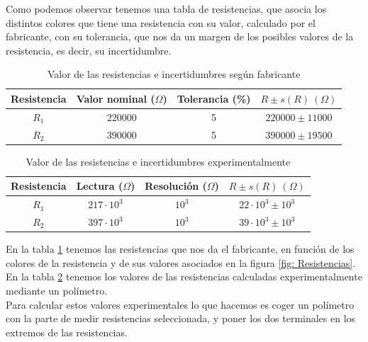 \documentclass[10pt,a4paper]{article}
\begin{document}
Como podemos observar tenemos una tabla de resistencias, que asocia los distintos colores que tiene una resistencia con su valor, calculado por el fabricante, con su tolerancia, que nos da un margen de los posibles valores de la resistencia, es decir, su incertidumbre.

\newpage

\begin{table}[t] %
\begin{center}
\begin{tabular}{| c | c | c | c |}
\hline
Resistencia & Valor nominal ($\Omega$) & Tolerancia (\%) & $R \pm s(R) \ (\Omega)$ \\ \hline
$R_1$ & $220000 $ &  5  & $220000 \pm 11000$\\
$R_2$ & $390000 $ &  5  & $390000 \pm 19500$ \\ \hline
\end{tabular}
\caption{Valor de las resistencias e incertidumbres según fabricante}
\label{tab:Resistencias fabricante}
\end{center}
\end{table}

\begin{table} %


\begin{center}
\begin{tabular}{| c | c | c | c |}
\hline
Resistencia & Lectura ($\Omega$) & Resolución ($\Omega$) & $R \pm s(R) \ (\Omega)$ \\ \hline
$R_1$ & $217 \cdot 10^3 $ & $10^3$  & $22 \cdot 10^3 \pm 10^3$\\
$R_2$ & $397 \cdot 10^3 $ & $10^3$  & $39 \cdot 10^3 \pm 10^3$ \\ \hline
\end{tabular}
\caption{Valor de las resistencias e incertidumbres experimentalmente}
\label{tab:Resistencias experimentalmente}
\end{center}
\end{table}
En la tabla \ref{tab:Resistencias fabricante} tenemos las resistencias que nos da el fabricante, en función de los colores de la resistencia y de sus valores asociados en la figura \ref{fig: Resistencias}. En la tabla \ref{tab:Resistencias experimentalmente} tenemos los valores de las resistencias calculadas experimentalmente mediante un polímetro. \\

Para calcular estos valores experimentales lo que hacemos es coger un polímetro con la parte de medir resistencias seleccionada, y poner los dos terminales en los extremos de las resistencias. \\
\end{document}
